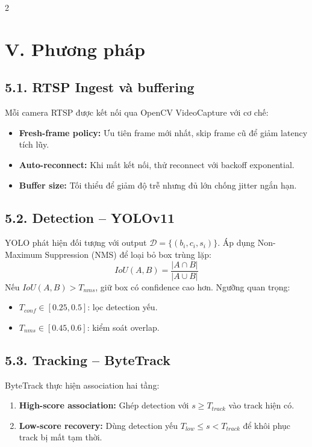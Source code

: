 \documentclass[a4paper,13pt]{article}
\begin{document}
\begin{multicols}{2}
\section*{V. Phương pháp}

\subsection*{5.1. RTSP Ingest và buffering}
Mỗi camera RTSP được kết nối qua OpenCV VideoCapture với cơ chế:
\begin{itemize}
    \item \textbf{Fresh-frame policy:} Ưu tiên frame mới nhất, skip frame cũ để giảm latency tích lũy.
    \item \textbf{Auto-reconnect:} Khi mất kết nối, thử reconnect với backoff exponential.
    \item \textbf{Buffer size:} Tối thiểu để giảm độ trễ nhưng đủ lớn chống jitter ngắn hạn.
\end{itemize}

\subsection*{5.2. Detection -- YOLOv11}
YOLO \cite{jocher2023yolov8} phát hiện đối tượng với output $\mathcal{D} = \{(b_i, c_i, s_i)\}$. Áp dụng Non-Maximum Suppression (NMS) để loại bỏ box trùng lặp:
\begin{equation}
IoU(A,B) = \frac{|A \cap B|}{|A \cup B|}
\label{eq:iou}
\end{equation}
Nếu $IoU(A,B) > T_{nms}$, giữ box có confidence cao hơn. Ngưỡng quan trọng:
\begin{itemize}
    \item $T_{conf} \in [0.25, 0.5]$: lọc detection yếu.
    \item $T_{nms} \in [0.45, 0.6]$: kiểm soát overlap.
\end{itemize}

\subsection*{5.3. Tracking -- ByteTrack}
ByteTrack \cite{zhang2022bytetrack} thực hiện association hai tầng:
\begin{enumerate}
    \item \textbf{High-score association:} Ghép detection với $s \geq T_{track}$ vào track hiện có.
    \item \textbf{Low-score recovery:} Dùng detection yếu $T_{low} \leq s < T_{track}$ để khôi phục track bị mất tạm thời.
\end{enumerate}


\end{multicols}
\end{document}
